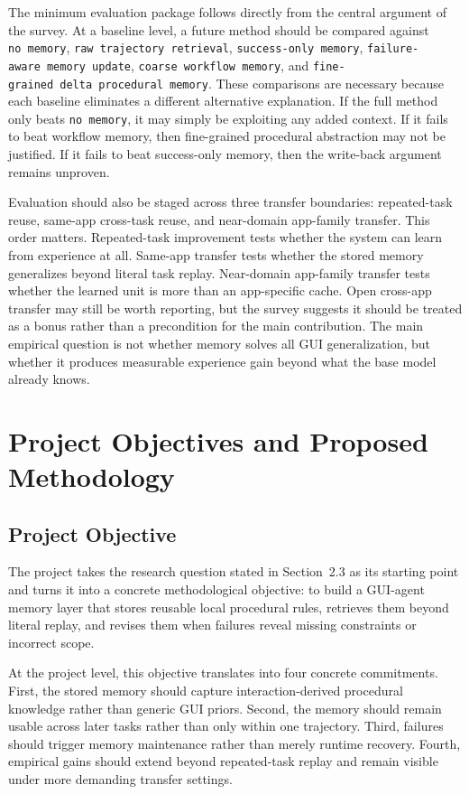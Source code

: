 \documentclass{article}
\begin{document}
The minimum evaluation package follows directly from the central
argument of the survey. At a baseline level, a future method should be
compared against \texttt{no\ memory},
\texttt{raw\ trajectory\ retrieval}, \texttt{success-only\ memory},
\texttt{failure-aware\ memory\ update},
\texttt{coarse\ workflow\ memory}, and
\texttt{fine-grained\ delta\ procedural\ memory}. These comparisons are
necessary because each baseline eliminates a different alternative
explanation. If the full method only beats \texttt{no\ memory}, it may
simply be exploiting any added context. If it fails to beat workflow
memory, then fine-grained procedural abstraction may not be justified.
If it fails to beat success-only memory, then the write-back argument
remains unproven.

Evaluation should also be staged across three transfer boundaries:
repeated-task reuse, same-app cross-task reuse, and near-domain
app-family transfer. This order matters. Repeated-task improvement tests
whether the system can learn from experience at all. Same-app transfer
tests whether the stored memory generalizes beyond literal task replay.
Near-domain app-family transfer tests whether the learned unit is more
than an app-specific cache. Open cross-app transfer may still be worth
reporting, but the survey suggests it should be treated as a bonus
rather than a precondition for the main contribution. The main empirical
question is not whether memory solves all GUI generalization, but
whether it produces measurable experience gain beyond what the base
model already knows.

\section{Project Objectives and Proposed Methodology}\label{8-project-objectives-and-proposed-methodology}

\subsection{Project Objective}\label{81-project-objective}

The project takes the research question stated in Section~2.3 as its
starting point and turns it into a concrete methodological objective: to
build a GUI-agent memory layer that stores reusable local procedural
rules, retrieves them beyond literal replay, and revises them when
failures reveal missing constraints or incorrect scope.

At the project level, this objective translates into four concrete
commitments. First, the stored memory should capture interaction-derived
procedural knowledge rather than generic GUI priors. Second, the memory
should remain usable across later tasks rather than only within one
trajectory. Third, failures should trigger memory maintenance rather
than merely runtime recovery. Fourth, empirical gains should extend
beyond repeated-task replay and remain visible under more demanding
transfer settings.
\end{document}

